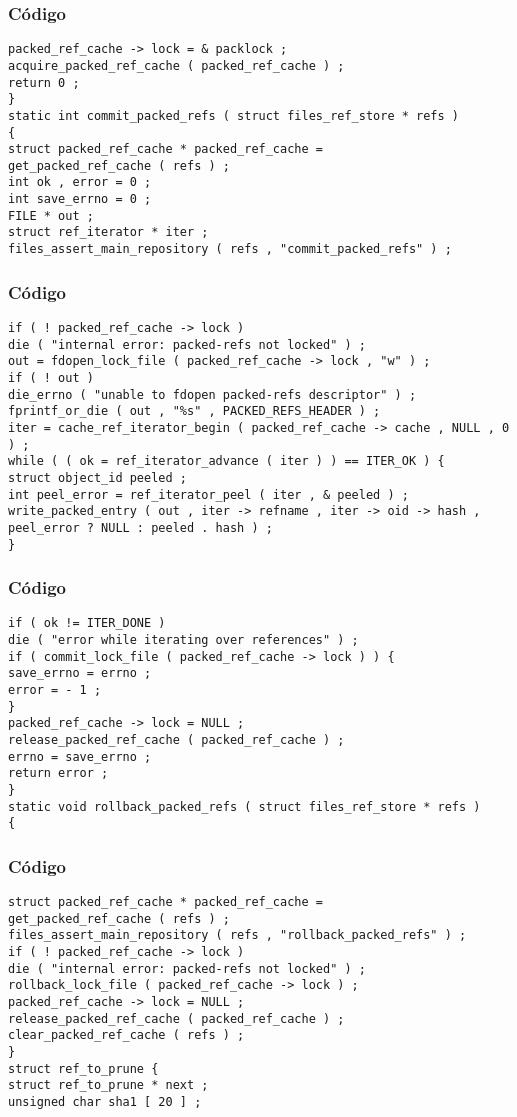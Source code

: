 \documentclass{beamer}
\begin{document}
\begin{frame}[fragile]
\frametitle{C\'odigo}
\begin{verbatim}
packed_ref_cache -> lock = & packlock ; 
acquire_packed_ref_cache ( packed_ref_cache ) ; 
return 0 ; 
} 
static int commit_packed_refs ( struct files_ref_store * refs ) 
{ 
struct packed_ref_cache * packed_ref_cache = 
get_packed_ref_cache ( refs ) ; 
int ok , error = 0 ; 
int save_errno = 0 ; 
FILE * out ; 
struct ref_iterator * iter ; 
files_assert_main_repository ( refs , "commit_packed_refs" ) ; 
\end{verbatim}
\end{frame}
\begin{frame}[fragile]
\frametitle{C\'odigo}
\begin{verbatim}
if ( ! packed_ref_cache -> lock ) 
die ( "internal error: packed-refs not locked" ) ; 
out = fdopen_lock_file ( packed_ref_cache -> lock , "w" ) ; 
if ( ! out ) 
die_errno ( "unable to fdopen packed-refs descriptor" ) ; 
fprintf_or_die ( out , "%s" , PACKED_REFS_HEADER ) ; 
iter = cache_ref_iterator_begin ( packed_ref_cache -> cache , NULL , 0 ) ; 
while ( ( ok = ref_iterator_advance ( iter ) ) == ITER_OK ) { 
struct object_id peeled ; 
int peel_error = ref_iterator_peel ( iter , & peeled ) ; 
write_packed_entry ( out , iter -> refname , iter -> oid -> hash , 
peel_error ? NULL : peeled . hash ) ; 
} 
\end{verbatim}
\end{frame}
\begin{frame}[fragile]
\frametitle{C\'odigo}
\begin{verbatim}
if ( ok != ITER_DONE ) 
die ( "error while iterating over references" ) ; 
if ( commit_lock_file ( packed_ref_cache -> lock ) ) { 
save_errno = errno ; 
error = - 1 ; 
} 
packed_ref_cache -> lock = NULL ; 
release_packed_ref_cache ( packed_ref_cache ) ; 
errno = save_errno ; 
return error ; 
} 
static void rollback_packed_refs ( struct files_ref_store * refs ) 
{ 
\end{verbatim}
\end{frame}
\begin{frame}[fragile]
\frametitle{C\'odigo}
\begin{verbatim}
struct packed_ref_cache * packed_ref_cache = 
get_packed_ref_cache ( refs ) ; 
files_assert_main_repository ( refs , "rollback_packed_refs" ) ; 
if ( ! packed_ref_cache -> lock ) 
die ( "internal error: packed-refs not locked" ) ; 
rollback_lock_file ( packed_ref_cache -> lock ) ; 
packed_ref_cache -> lock = NULL ; 
release_packed_ref_cache ( packed_ref_cache ) ; 
clear_packed_ref_cache ( refs ) ; 
} 
struct ref_to_prune { 
struct ref_to_prune * next ; 
unsigned char sha1 [ 20 ] ; 
\end{verbatim}
\end{frame}
\end{document}
